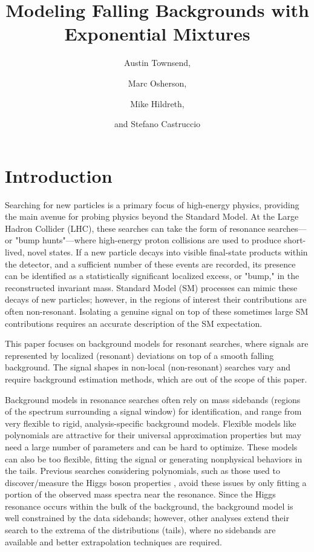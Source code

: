 \documentclass[a4paper,11pt]{article}
\title{Modeling Falling Backgrounds with Exponential Mixtures}
\author{Austin Townsend,}
\author{Marc Osherson,}
\author{Mike Hildreth, }
\author{and Stefano Castruccio}
\affiliation{University of Notre Dame,\\
USA}
\begin{document}
\maketitle
\flushbottom

\section{Introduction}
\label{sec:intro}

Searching for new particles is a primary focus of high-energy physics, providing the main avenue for probing physics beyond the Standard Model. At the Large Hadron Collider (LHC), these searches can take the form of resonance searches—or "bump hunts"—where high-energy proton collisions are used to produce short-lived, novel states. If a new particle decays into visible final-state products within the detector, and a sufficient number of these events are recorded, its presence can be identified as a statistically significant localized excess, or "bump," in the reconstructed invariant mass. Standard Model (SM) processes can mimic these decays of new particles; however, in the regions of interest their contributions are often non-resonant. Isolating a genuine signal on top of these sometimes large SM contributions requires an accurate description of the SM expectation.

This paper focuses on background models for resonant searches, where signals are 
represented by localized (resonant) deviations on top of a smooth falling background. The signal 
shapes in non-local (non-resonant) searches vary and require background estimation methods, which 
are out of the scope of this paper.

Background models in resonance searches often rely on mass sidebands (regions 
of the spectrum surrounding a signal window) for identification, and range from 
very flexible to rigid, analysis-specific background models. Flexible models like polynomials are attractive for their universal approximation properties but may need a large number of parameters and can 
be hard to optimize. These models can also be too flexible, fitting the signal or generating nonphysical behaviors in the tails. Previous searches considering polynomials, 
such as those used to discover/measure the Higgs boson properties \cite{CMS_Higgs_Discovery, Aad_2014}, avoid these issues by only fitting a portion of the observed mass spectra near the resonance. Since the Higgs resonance 
occurs within the bulk of the background, the background model is well constrained by the data 
sidebands; however, other analyses extend their search to the extrema of the distributions (tails), where no sidebands are 
available and better extrapolation techniques are required.
\end{document}
